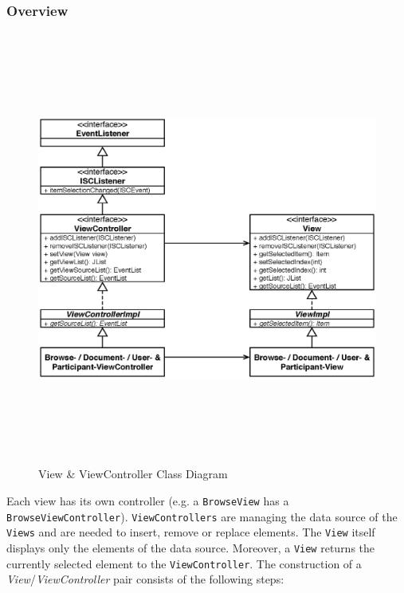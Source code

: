 \subsubsection{Overview}
\begin{figure}[H]
\begin{center}
  \includegraphics[height=5.62in, width=7.19in]{../images/finalreport/application_views_controllers.eps}
\caption{View \& ViewController Class Diagram}
\label{application_views_controllers}
\end{center}
\end{figure}

Each view has its own controller (e.g. a \texttt{Browse\-View} has a \texttt{Browse\-View\-Controller}). \texttt{View\-Controllers} are managing the data source of the \texttt{Views} and are needed to insert, remove or replace elements. The \texttt{View} itself displays only the elements of the data source. Moreover, a \texttt{View} returns the currently selected element to the \texttt{View\-Controller}. The construction of a \emph{View}/\emph{ViewController} pair consists of the following steps:

